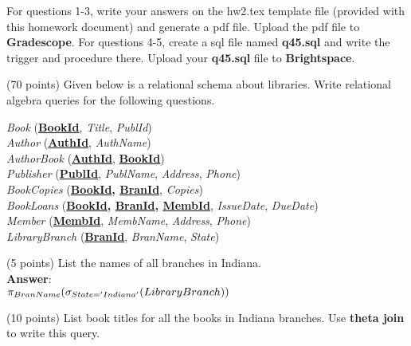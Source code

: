 For questions 1-3, write your answers on the hw2.tex template file (provided with this homework document) and generate a pdf file. Upload the pdf file to \textbf{Gradescope}. For questions 4-5, create a sql file named \textbf{q45.sql} and write the trigger and procedure there. Upload your \textbf{q45.sql} file to \textbf{Brightspace}.\\

\begin{questions}

\question (70 points) Given below is a relational schema about libraries. Write relational algebra queries for the following questions.\\

\begin{addmargin}[1em]{2em}%

    \textit{Book} (\textbf{\underline{BookId}},  \textit{Title}, \textit{PublId})\\
    \textit{Author} (\textbf{\underline{AuthId}}, \textit{AuthName})\\
    \textit{AuthorBook} (\textbf{\underline{AuthId}}, \textbf{\underline{BookId}})\\
    \textit{Publisher} (\textbf{\underline{PublId}}, \textit{PublName}, \textit{Address}, \textit{Phone})\\
    \textit{BookCopies} (\textbf{\underline{BookId}, \underline{BranId}}, \textit{Copies})\\
    \textit{BookLoans} (\textbf{\underline{BookId}, \underline{BranId}, \underline{MembId}}, \textit{IssueDate}, \textit{DueDate})\\
    \textit{Member} (\textbf{\underline{MembId}},  \textit{MembName}, \textit{Address}, \textit{Phone})\\
    \textit{LibraryBranch} (\textbf{\underline{BranId}}, \textit{BranName}, \textit{State})\\
    
\end{addmargin}

\begin{choices}

	\choice(5 points) List the names of all branches in Indiana.\\
	\textbf{Answer}:\\
    $\pi_{BranName}(\sigma_{State='Indiana' } (LibraryBranch) )$
	
	\choice(10 points) List book titles for all the books in Indiana branches. Use \textbf{theta join} to write this query. 
	

\end{choices}
\end{questions}
